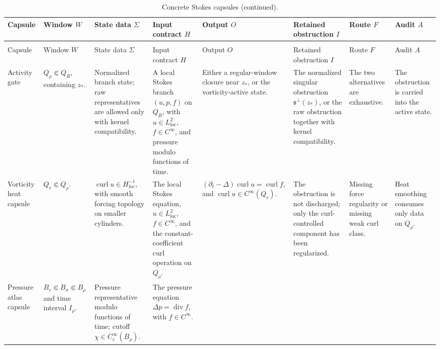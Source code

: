 \documentclass[11pt]{article}
\newlength{\stokesCapsuleTableWidth}
\theoremstyle{plain}
\theoremstyle{definition}
\theoremstyle{remark}
\newcommand{\curl}{\operatorname{curl}}
\newcommand{\divergence}{\operatorname{div}}
\newcommand{\loc}{\mathrm{loc}}
\begin{document}
\begingroup
\scriptsize
\setlength{\tabcolsep}{2pt}
\setlength{\arrayrulewidth}{0.25pt}
\setlength{\stokesCapsuleTableWidth}{\dimexpr\linewidth+0.42in\relax}
\setlength{\LTleft}{-0.40in}
\setlength{\LTright}{\fill}
\begin{longtable}{|L{0.100\stokesCapsuleTableWidth}|L{0.105\stokesCapsuleTableWidth}|L{0.115\stokesCapsuleTableWidth}|L{0.135\stokesCapsuleTableWidth}|L{0.145\stokesCapsuleTableWidth}|L{0.145\stokesCapsuleTableWidth}|L{0.085\stokesCapsuleTableWidth}|L{0.095\stokesCapsuleTableWidth}|}
\caption{Concrete Stokes capsules.}
\label{tab:stokes-capsules}\\
\hline
Capsule & Window \(W\) & State data \(\Sigma\) & Input contract \(H\) & Output \(O\) &
Retained obstruction \(I\) & Route \(F\) & Audit \(A\) \\
\hline
\endfirsthead
\caption[]{Concrete Stokes capsules (continued).}\\
\hline
Capsule & Window \(W\) & State data \(\Sigma\) & Input contract \(H\) & Output \(O\) &
Retained obstruction \(I\) & Route \(F\) & Audit \(A\) \\
\hline
\endhead
Activity gate &
\(Q_\rho\Subset Q_R\), containing \(z_*\). &
Normalized branch state; raw representatives are allowed only with kernel
compatibility. &
A local Stokes branch \((u,p,f)\) on \(Q_R\), with \(u\in L^2_{\loc}\),
\(f\in C^\infty\), and pressure modulo functions of time. &
Either a regular-window closure near \(z_*\), or the vorticity-active state. &
The normalized singular obstruction \(\mathfrak s^\perp(z_*)\), or the raw
obstruction together with kernel compatibility. &
The two alternatives are exhaustive. &
The obstruction is carried into the active state. \\
\hline
Vorticity heat capsule &
\(Q_r\Subset Q_\rho\). &
\(\curl u\in H^{-1}_{\loc}\), with smooth forcing topology on smaller
cylinders. &
The local Stokes equation, \(u\in L^2_{\loc}\), \(f\in C^\infty\), and the
constant-coefficient curl operation on \(Q_\rho\). &
\((\partial_t-\Delta)\curl u=\curl f\), and
\(\curl u\in C^\infty(Q_r)\). &
The obstruction is not discharged; only the curl-controlled component has been
regularized. &
Missing force regularity or missing weak curl class. &
Heat smoothing consumes only data on \(Q_\rho\). \\
\hline
Pressure atlas capsule &
\(B_r\Subset B_\sigma\Subset B_\rho\) and time interval \(I_\rho\). &
Pressure representative modulo functions of time; cutoff
\(\chi\in C_c^\infty(B_\rho)\). &
The pressure equation \(\Delta p=\divergence f\), with \(f\in C^\infty\). &

\end{longtable}
\end{document}
